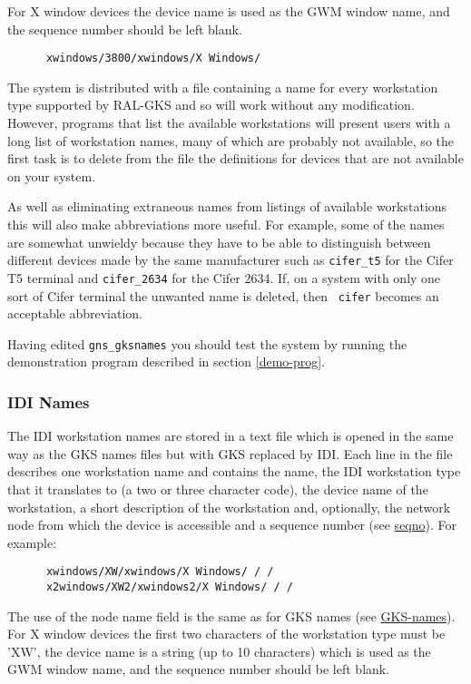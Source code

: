 For X window devices the device name is used as the GWM window name, and the
sequence number should be left blank. 
\begin{verbatim}
      xwindows/3800/xwindows/X Windows/
\end{verbatim}

The system is distributed with a file containing a name for every workstation
type supported by RAL-GKS and so will work without any modification. However,
programs that list the available workstations will
present users with a long list of workstation names, many of which
are probably not available, so the first task is to delete from the 
file the definitions for devices that are not available on your system. 

As well as eliminating extraneous names from listings of available workstations
this will also make abbreviations more useful. For example, some of the 
names are somewhat unwieldy because they have to be able to distinguish between
different devices made by the same manufacturer such as {\tt cifer\_t5} for the
Cifer T5 terminal and {\tt cifer\_2634} for the Cifer 2634. If, on a system with
only one sort of Cifer terminal the unwanted name is deleted, then {\tt
cifer} becomes an acceptable abbreviation.

Having edited {\tt gns\_gksnames} you should test the system by 
running the
demonstration program described in section \ref{demo-prog}. 

\subsubsection{IDI Names}

The IDI workstation names are stored in a text file which is opened in the
same way as the GKS names files but with GKS replaced by IDI.
Each line in the file describes one workstation name
and contains the name, the IDI workstation type that it translates to (a two
or three character code), the
device name of the workstation, a short description of the workstation and,
optionally, the network node from which the device is accessible and a
sequence number (see \hyperref{this section}{section~}{}{seqno}). For example:
\begin{verbatim}
      xwindows/XW/xwindows/X Windows/ / /
      x2windows/XW2/xwindows2/X Windows/ / /
\end{verbatim}
The use of the node name field is the same as for GKS names
(see \hyperref{this section}{section~}{}{GKS-names}). 
For X window devices the first two characters
of the workstation type must be 'XW', the device name is a string (up to
10 characters) which is used as the GWM window name, and the sequence
number should be left blank.

